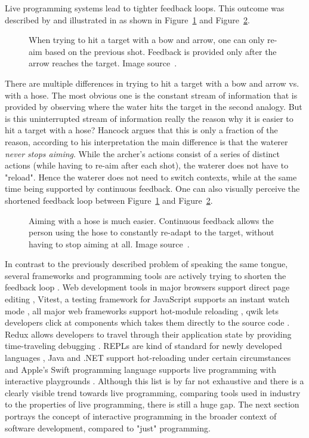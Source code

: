 Live programming systems lead to tighter feedback loops.
This outcome was described by \citeauthor{hancock_real-time_2003} \cite{hancock_real-time_2003} and illustrated in \cite{aguiar_live_2019} as shown in Figure~\ref{fig:bow-arrow} and Figure~\ref{fig:waterhose}.
%
\begin{figure}[h]
\centering

\caption{When trying to hit a target with a bow and arrow, one can only re-aim based on the previous shot. Feedback is provided only after the arrow reaches the target. Image source~\cite{aguiar_live_2019}.}
\label{fig:bow-arrow}
\end{figure}
%
There are multiple differences in trying to hit a target with a bow and arrow vs. with a hose.
The most obvious one is the constant stream of information that is provided by observing where the water hits the target in the second analogy.
But is this uninterrupted stream of information really the reason why it is easier to hit a target with a hose?
Hancock \cite{hancock_real-time_2003} argues that this is only a fraction of the reason, according to his interpretation the main difference is that the waterer \emph{never stops aiming}.
While the archer's actions consist of a series of distinct actions (while having to re-aim after each shot), the waterer does not have to "reload".
Hence the waterer does not need to switch contexts, while at the same time being supported by continuous feedback.
One can also visually perceive the shortened feedback loop between Figure~\ref{fig:bow-arrow} and Figure~\ref{fig:waterhose}.

\begin{figure}[h]
\centering

\caption{Aiming with a hose is much easier. Continuous feedback allows the person using the hose to constantly re-adapt to the target, without having to stop aiming at all. Image source~\cite{aguiar_live_2019}.}
\label{fig:waterhose}
\end{figure}

In contrast to the previously described problem of speaking the same tongue, several frameworks and programming tools are actively trying to shorten the feedback loop \cite{kubelka_road_2018}.
Web development tools in major browsers support direct page editing \addref, Vitest, a testing framework for JavaScript supports an instant watch mode \addref, all major web frameworks support hot-module reloading \addref, qwik lets developers click at components which takes them directly to the source code \addref. Redux allows developers to travel through their application state by providing time-traveling debugging \addref.
REPLs are kind of standard for newly developed languages \addref, Java and .NET support hot-reloading under certain circumstances \addref and Apple's Swift programming language supports live programming with interactive playgrounds \addref.
Although this list is by far not exhaustive and there is a clearly visible trend towards live programming, comparing tools used in industry to the properties of live programming, there is still a huge gap.
The next section portrays the concept of interactive programming in the broader context of software development, compared to "just" programming.

